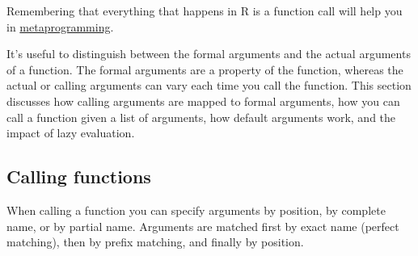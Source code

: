 Remembering that everything that happens in R is a function call will
help you in \hyperref[expressions]{metaprogramming}.


It's useful to distinguish between the formal arguments and the actual
arguments of a function. The formal arguments are a property of the
function, whereas the actual or calling arguments can vary each time you
call the function. This section discusses how calling arguments are
mapped to formal arguments, how you can call a function given a list of
arguments, how default arguments work, and the impact of lazy
evaluation.

\subsection{Calling functions}

When calling a function you can specify arguments by position, by
complete name, or by partial name. Arguments are matched first by exact
name (perfect matching), then by prefix matching, and finally by
position. 

\begin{Shaded}
\begin{Highlighting}[]
\StringTok{ }
  \NormalTok{(}   
\NormalTok{\}}
\NormalTok{(}\NormalTok{(}\NormalTok{, }\NormalTok{, }\NormalTok{))}
\NormalTok{(}\NormalTok{(}\NormalTok{, }\NormalTok{, } \NormalTok{))}

\NormalTok{(}\NormalTok{(}\NormalTok{, }\NormalTok{, } \NormalTok{))}

\NormalTok{(}\NormalTok{(}\NormalTok{, }\NormalTok{, } \NormalTok{))}
\end{Highlighting}
\end{Shaded}

